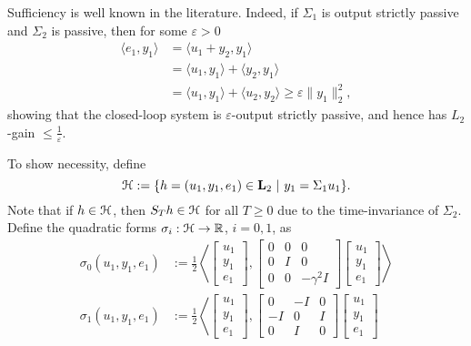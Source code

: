 \documentclass{ifacconf}
\def\Real{\mathbb{R}} \def\Ints{\mathbb{Z}} \def\Natural{\mathbb{N}}
\newcommand{\Ltwo}{\boldsymbol{\rm L}_{2}}
\theoremstyle{definition}
\begin{document}
\begin{pf}
 Sufficiency is well known in the literature. Indeed, if $\Sigma_1$ is output strictly passive and $\Sigma_2$ is passive, then for some $\varepsilon > 0$
 \begin{align*}
 \langle e_1, y_1 \rangle & = \langle u_1 + y_2, y_1 \rangle \\
 & = \langle u_1, y_1 \rangle + \langle y_2, y_1 \rangle \\
 & = \langle u_1, y_1 \rangle + \langle u_2, y_2 \rangle \geq \varepsilon \| y_1\|_2^2,
 \end{align*}
 showing that the closed-loop system is $\varepsilon$-output strictly passive, and hence has $L_2$-gain $\leq \frac{1}{\varepsilon}$. 

 To show necessity, define
\[
\HH := \{h = (u_1, y_1, e_1) \in \Ltwo\ |\ y_1 = \Sigma_1 u_1\}.
\]
Note that if $h \in \mathcal{H}$, then $S_T h \in \mathcal{H}$ for all $T \geq 0$ due to the time-invariance of $\Sigma_2$. Define the quadratic forms $\sigma_i : \HH
\to \Real$, $i = 0, 1$, as 
\begin{align*}
 \sigma_0(u_1, y_1, e_1) & := \frac{1}{2}\left\langle 
\begin{bmatrix} 
 u_1 \\
 y_1 \\
 e_1 
\end{bmatrix},
\begin{bmatrix}
0 & 0 & 0  \\
0 & I & 0  \\
0 & 0 & -\gamma^2 I 
\end{bmatrix}
\begin{bmatrix} 
 u_1 \\
 y_1 \\
 e_1 
\end{bmatrix}
\right\rangle \\
 \sigma_1(u_1, y_1, e_1) & := \frac{1}{2} \left\langle 
\begin{bmatrix} 
 u_1 \\
 y_1 \\
 e_1 
\end{bmatrix},
\begin{bmatrix}
0 & -I & 0 \\
-I & 0 & I \\
0 & I &0  
\end{bmatrix}
\begin{bmatrix} 
 u_1 \\
 y_1 \\
 e_1 
\end{bmatrix}

\end{align*}
\end{pf}
\end{document}

